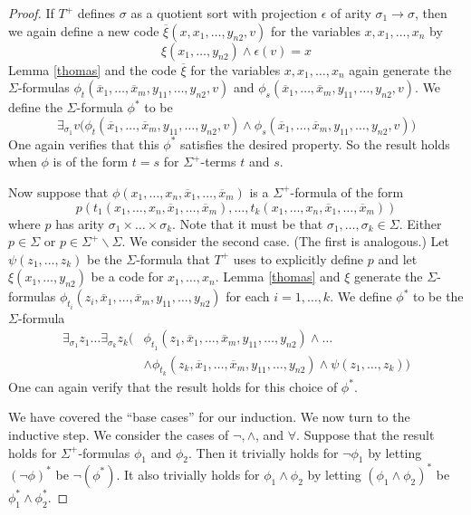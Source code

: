 \begin{proof}
If $T^+$ defines $\sigma$ as a quotient sort with projection
$\epsilon$ of arity $\sigma_1\rightarrow\sigma$, then we again define
a new code $\overline{\xi}(x, x_1,\ldots, y_{n2}, v)$ for the
variables $x, x_1,\ldots, x_n$ by
$$
\xi(x_1,\ldots, y_{n2})\land\epsilon(v)=x
$$
Lemma \ref{thomas} and the code $\overline{\xi}$ for the variables
$x, x_1,\ldots, x_n$ again generate the $\Sigma$-formulas
$\phi_t(\overline{x}_1,\ldots, \overline{x}_m, y_{11}, \ldots, y_{n2},
v)$ and
$\phi_s(\overline{x}_1,\ldots, \overline{x}_m, y_{11}, \ldots, y_{n2},
v)$. We define the $\Sigma$-formula $\phi^*$ to be
\[ \exists_{\sigma_1} v \big(\phi_t(\overline{x}_1,\ldots,
  \overline{x}_m, y_{11}, \ldots, y_{n2}, v)\land
  \phi_s(\overline{x}_1,\ldots, \overline{x}_m, y_{11}, \ldots,
  y_{n2}, v)\big) \] One again verifies that this $\phi^*$ satisfies
the desired property. So the result holds when $\phi$ is of the form
$t=s$ for $\Sigma^+$-terms $t$ and $s$.

Now suppose that $\phi(x_1,\ldots, x_n,\overline{x}_1,\ldots, \overline{x}_m)$ is a $\Sigma^+$-formula of the form 
\[ p(t_1(x_1,\ldots, x_n,\overline{x}_1,\ldots,\overline{x}_m),\ldots,
  t_k(x_1,\ldots, x_n, \overline{x}_1,\ldots, \overline{x}_m)) \]
where $p$ has arity $\sigma_1\times\ldots\times\sigma_k$. Note that it
must be that $\sigma_1,\ldots,\sigma_k\in\Sigma$. Either $p\in\Sigma$
or $p\in\Sigma^+\backslash\Sigma$. We consider the second case. (The
first is analogous.) Let $\psi(z_1,\ldots, z_k)$ be the
$\Sigma$-formula that $T^+$ uses to explicitly define $p$ and let
$\xi(x_1,\ldots, y_{n2})$ be a code for $x_1,\ldots, x_n$. Lemma
\ref{thomas} and $\xi$ generate the $\Sigma$-formulas
$\phi_{t_i}(z_i, \overline{x}_1,\ldots, \overline{x}_m, y_{11},
\ldots, y_{n2})$ for each $i=1,\ldots, k$. We define $\phi^*$ to be
the $\Sigma$-formula
\begin{align*}
\exists_{\sigma_1}z_1\ldots\exists_{\sigma_k}z_k\big(&\phi_{t_1}(z_1,\overline{x}_1,\ldots, \overline{x}_m,y_{11},\ldots, y_{n2})\land\ldots\\ &\land\phi_{t_k}(z_k,\overline{x}_1,\ldots, \overline{x}_m,y_{11},\ldots, y_{n2})\land\psi(z_1,\ldots, z_k)\big)
\end{align*}
One can again verify that the result holds for this choice of
$\phi^*$.

We have covered the ``base cases'' for our induction. We now turn to
the inductive step. We consider the cases of $\lnot, \land$, and
$\forall$. Suppose that the result holds for $\Sigma^+$-formulas
$\phi_1$ and $\phi_2$. Then it trivially holds for $\lnot\phi_1$ by
letting $(\lnot\phi)^*$ be $\lnot(\phi^*)$. It also trivially holds
for $\phi_1\land\phi_2$ by letting $(\phi_1\land\phi_2)^*$ be
$\phi_1^*\land\phi_2^*$.


\end{proof}
